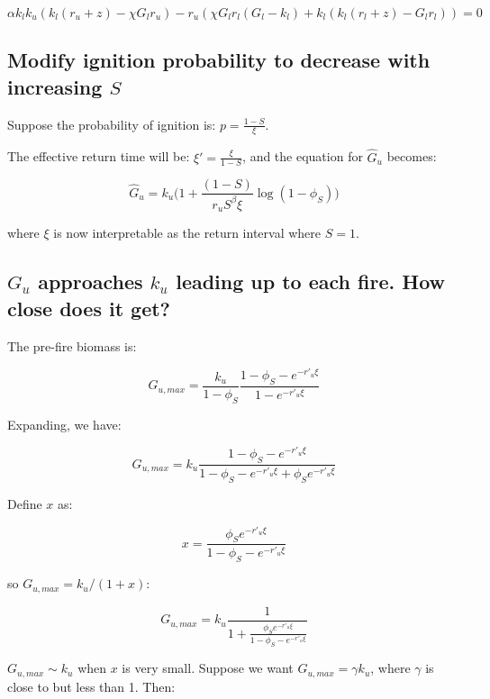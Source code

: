 \documentclass[12pt]{article}
\begin{document}
$$
{\alpha  {k_l} {k_u} ({k_l} ({r_u}+z)-\chi 
   {G_l} {r_u})-{r_u} (\chi  {G_l} {r_l}
   ({G_l}-{k_l})+{k_l} ({k_l}
   ({r_l}+z)-{G_l} {r_l}))}
 = 0
   $$

\subsection*{Modify ignition probability to decrease with increasing $S$}

Suppose the probability of ignition is: $p = \frac{1-S}{\xi}$.

The effective return time will be: $\xi' = \frac{\xi} { 1- S}$, and the equation for $\hat{G}_u $ becomes:

\begin{equation}
\hat{G}_u =
  k_u \big( 1 + \frac{(1-S)}{r_u S^\beta \xi} \log(1-\phi_S) \big)
\end{equation}

where $\xi$ is now interpretable as the return interval where $S=1$.

 \subsection*{ $G_u$ approaches $k_u$  leading up to each fire. How close does it get?}

The  pre-fire biomass is:

\begin{equation}
  G_{u,max} =  \frac{k_u }{1-\phi_S}   \frac{1- \phi_S - e^{-r'_u \xi} }{1 - e^{-r'_u \xi}}
  \label{G_u_max}
\end{equation}

Expanding, we have:

\begin{equation}
  G_{u,max} =  k_u  \frac{1- \phi_S - e^{-r'_u \xi} }{1  - \phi_S - e^{-r'_u \xi} + \phi_S  e^{-r'_u \xi}}
\end{equation}


Define $x$ as:

\begin{equation}
x = \frac{ \phi_S  e^{-r'_u \xi}}{1- \phi_S - e^{-r'_u \xi}}
\end{equation}

so $ G_{u,max} = k_u /(1+x)$:

\begin{equation}
G_{u,max}  = k_u \frac{1}{1 + \frac{ \phi_S  e^{-r'_u \xi}}{1- \phi_S - e^{-r'_u \xi}}}
\end{equation}


$G_{u,max} \sim k_u$ when $x$ is very small. 
Suppose we want $G_{u,max} = \gamma k_u$, where $\gamma$ is close to but less than 1.  Then:
\end{document}
